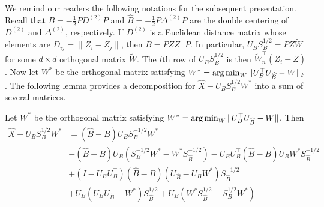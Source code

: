 We remind our readers the following notations for the subsequent presentation. 
 Recall that $B = -\tfrac{1}{2} P D^{(2)} P$ and $\hat{B} = -\frac{1}{2} P \Delta^{(2)} P$ are the double centering of $D^{(2)}$ and $\Delta^{(2)}$, respectively. If $D^{(2)}$ 
is a Euclidean distance matrix whose elements are $D_{ij} = \|Z_i -Z_j\|$, then $B = P Z Z^{\top} P$. In particular, $U_B S_B^{1/2} = P Z \tilde{W}$ for some $d \times d$ orthogonal matrix $\tilde{W}$. The $i$th row of $U_B S_B^{1/2}$ is then $\tilde{W}_n^{\top} (Z_i - \bar{Z})$. Now let $W^{*}$ be the orthogonal matrix satisfying $W^{*} = \operatorname*{arg\,min}_{W} \|U_B^{\top} U_{\widehat{B}} - W\|_{F}$. %
The following lemma provides a decomposition for $\hat{X} - U_B S_B^{1/2} W^*$ into a sum of several matrices. 
\begin{lemma}
\label{appthm2}
  Let $W^{*}$ be the orthogonal matrix satisfying $W^{*} = \operatorname*{arg\,min}_{W} \|U_B^{\top} U_{\widehat{B}} - W\|$. Then 
      \begin{align}
          \hat{X} - U_B S_B^{1/2} W^*  &=   ( \hat{B} - B) U_B S_B^{-1/2} W^{*}  \label{term1}\\
          & - (\hat{B} - B) U_B (S_{B}^{-1/2} W^{*} - W^{*} S_{\hat{B}}^{-1/2})  - U_B U_B^{\top} (\hat{B} - B) U_B W^* S_{\hat{B}}^{-1/2}      \label{term3}\\
          & + (I - U_B U_B^{\top}) (\hat{B} - B) (U_{\hat{B}} - U_B W^{*}) S_{\hat{B}}^{-1/2}     \label{term4}\\
          & + U_B (U_B^{\top} U_{\hat{B}} - W^*) S_{\hat{B}}^{1/2} + U_B (W^{*} S_{\hat{B}}^{1/2} - S_B^{1/2} W^{*})     \label{term6}
    \end{align}
\end{lemma}
